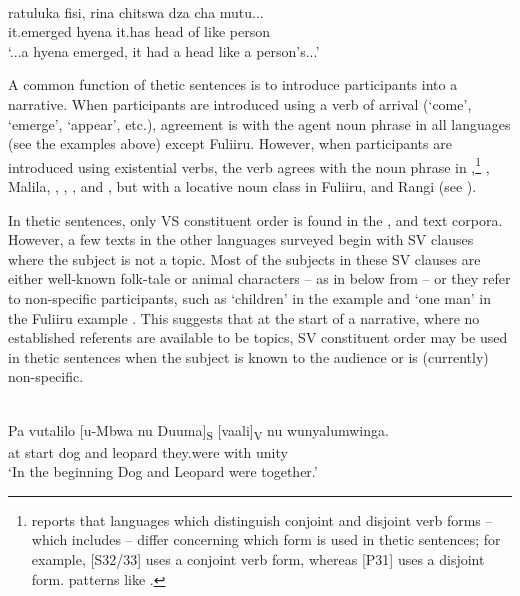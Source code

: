 \documentclass[output=paper]{langsci/langscibook}
\begin{document}
\ea\label{ex:25.nicolle}
\\
\gll ratuluka fisi, rina chitswa dza cha mutu...\\
it.emerged hyena it.has head of like person \\
\glt ‘...a hyena emerged, it had a head like a person’s...’
\z

A common function of thetic sentences is to introduce participants into a narrative. When participants are introduced using a verb of arrival (‘come’, ‘emerge’, ‘appear’, etc.), agreement is with the agent noun phrase in all languages (see the examples above) except Fuliiru. However, when participants are introduced using existential verbs, the verb agrees with the noun phrase in ,\footnote{\citet{vanderwal2008} reports that languages which distinguish conjoint and disjoint verb forms -- which includes  -- differ concerning which form is used in thetic sentences; for example,  [S32/33] uses a conjoint verb form, whereas  [P31] uses a disjoint form.  patterns like .} , Malila, , , ,  and , but with a locative noun class in Fuliiru,  and Rangi (see \citealt[17--20]{nicolle2015b}).

In thetic sentences, only VS constituent order is found in the ,  and  text corpora. However, a few texts in the other languages surveyed begin with SV clauses where the subject is not a topic. Most of the subjects in these SV clauses are either well-known folk-tale or animal characters -- as in  below from  -- or they refer to non-specific participants, such as ‘children’ in the  example  and ‘one man’ in the Fuliiru example . This suggests that at the start of a narrative, where no established referents are available to be topics, SV constituent order may be used in thetic sentences when the subject is known to the audience or is (currently) non-specific.

\ea\label{ex:26.nicolle}
\\
\gll Pa vutalilo [u-Mbwa nu Duuma]\textsubscript{S} [vaali]\textsubscript{V} nu wunyalumwinga.\\
at start {\db}dog and leopard {\db}they.were with unity\\
\glt ‘In the beginning Dog and Leopard were together.’
\z
\end{document}
